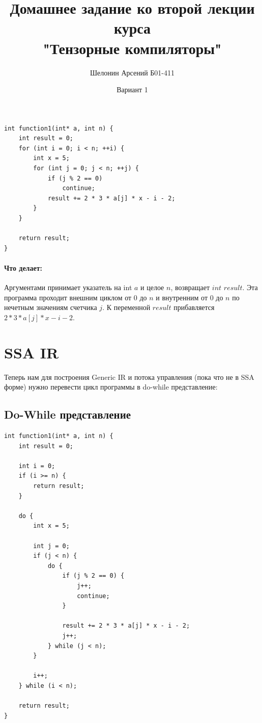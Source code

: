 

\graphicspath{{img/}}

\title{Домашнее задание ко второй лекции курса\\ "Тензорные компиляторы"}

\author{Шелонин Арсений Б01-411}
\date{Вариант 1}



\maketitle

\begin{lstlisting}
int function1(int* a, int n) {
    int result = 0;
    for (int i = 0; i < n; ++i) {
        int x = 5;
        for (int j = 0; j < n; ++j) {
            if (j % 2 == 0)
                continue;
            result += 2 * 3 * a[j] * x - i - 2;
        } 
    }

    return result;
}
\end{lstlisting}

\paragraph{Что делает:} Аргументами принимает указатель на int $a$ и целое $n$, возвращает $int$  $result$. Эта программа проходит внешним циклом от 0 до $n$ и внутренним от 0 до $n$ по нечетным значениям счетчика $j$. К переменной $result$ прибавляется $2 * 3 * a[j] * x - i - 2$. 
\newpage

\section{SSA IR}

Теперь нам для построения Generic IR и потока управления (пока что не в SSA форме) нужно перевести цикл программы в do-while представление:

\subsection{Do-While представление}
\begin{lstlisting}
int function1(int* a, int n) {
    int result = 0;

    int i = 0;
    if (i >= n) {
        return result;
    }

    do {
        int x = 5;

        int j = 0;
        if (j < n) {
            do {
                if (j % 2 == 0) {
                    j++;
                    continue;
                }
                
                result += 2 * 3 * a[j] * x - i - 2;
                j++;
            } while (j < n);
        }
        
        i++;
    } while (i < n);

    return result;
}
\end{lstlisting}

